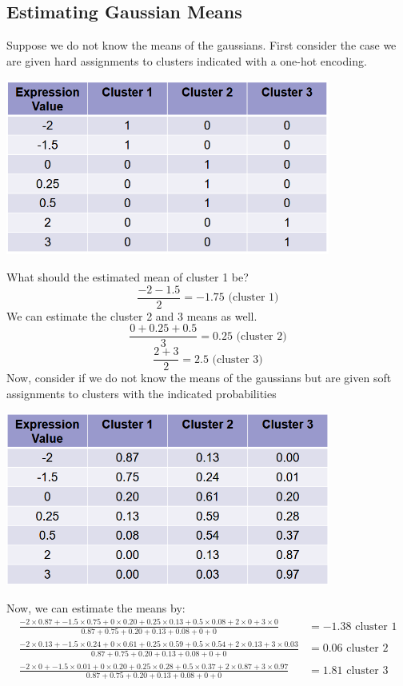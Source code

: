 \documentclass[10pt]{article}
\begin{document}
\subsection*{Estimating Gaussian Means}
Suppose we do not know the means of the gaussians.  First consider the case we are given hard assignments to clusters indicated with a one-hot encoding.
\begin{center}
    \includegraphics*[width=0.8\textwidth]{W6_33.png}
\end{center}
What should the estimated mean of cluster 1 be?
\[\frac{-2 - 1.5}{2} = -1.75 \text{ (cluster 1)}\]
We can estimate the cluster 2 and 3 means as well.
\[\frac{0 + 0.25 + 0.5}{3} = 0.25 \text{ (cluster 2)}\]
\[\frac{2 + 3}{2} = 2.5 \text{ (cluster 3)}\]
Now, consider if we do not know the means of the gaussians but are given soft assignments to clusters with the indicated probabilities
\begin{center}
    \includegraphics*[width=0.8\textwidth]{W6_34.png}
\end{center}
Now, we can estimate the means by:
\begin{align*}
    \frac{-2 \times 0.87 + -1.5 \times 0.75 + 0 \times 0.20 + 0.25 \times 0.13 + 0.5 \times 0.08 + 2 \times 0 + 3 \times 0}{0.87 + 0.75 + 0.20 + 0.13 + 0.08 + 0 + 0} &= -1.38 \text{ cluster 1}\\
    \frac{-2 \times 0.13 + -1.5 \times 0.24 + 0 \times 0.61 + 0.25 \times 0.59 + 0.5 \times 0.54 + 2 \times 0.13 + 3 \times 0.03}{0.87 + 0.75 + 0.20 + 0.13 + 0.08 + 0 + 0} &= 0.06 \text{ cluster 2}\\
    \frac{-2 \times 0 + -1.5 \times 0.01 + 0 \times 0.20 + 0.25 \times 0.28 + 0.5 \times 0.37 + 2 \times 0.87 + 3 \times 0.97}{0.87 + 0.75 + 0.20 + 0.13 + 0.08 + 0 + 0} &= 1.81 \text{ cluster 3}
\end{align*}
\end{document}
